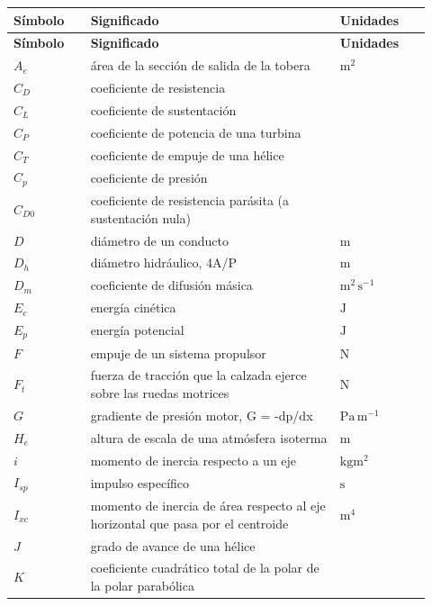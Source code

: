 \documentclass[10pt,openany]{book}
\begin{document}
\begingroup
\setlength{\LTpre}{0pt}
\setlength{\LTpost}{0pt}
\begin{longtable}{@{}>{\centering\arraybackslash}p{0.17\linewidth}>{\raggedright\arraybackslash}p{0.55\linewidth}>{\raggedright\arraybackslash}p{0.2\linewidth}@{}}
\textbf{Símbolo} & \textbf{Significado} & \textbf{Unidades} \\
\hline
\endfirsthead
\textbf{Símbolo} & \textbf{Significado} & \textbf{Unidades} \\
\hline
\endhead
$A_{e}$ & área de la sección de salida de la tobera & $\mathrm{m^{2}}$ \\
$C_{D}$ & coeficiente de resistencia &  \\
$C_{L}$ & coeficiente de sustentación &  \\
$C_{P}$ & coeficiente de potencia de una turbina &  \\
$C_{T}$ & coeficiente de empuje de una hélice &  \\
$C_{p}$ & coeficiente de presión &  \\
$C_{D0}$ & coeficiente de resistencia parásita (a sustentación nula) &  \\
$D$ & diámetro de un conducto & $\mathrm{m}$ \\
$D_{h}$ & diámetro hidráulico, 4A/P & $\mathrm{m}$ \\
$D_{m}$ & coeficiente de difusión másica & $\mathrm{m^{2}\,s^{-1}}$ \\
$E_{c}$ & energía cinética & $\mathrm{J}$ \\
$E_{p}$ & energía potencial & $\mathrm{J}$ \\
$F$ & empuje de un sistema propulsor & $\mathrm{N}$ \\
$F_{t}$ & fuerza de tracción que la calzada ejerce sobre las ruedas motrices & $\mathrm{N}$ \\
$G$ & gradiente de presión motor, G = -dp/dx & $\mathrm{Pa\,m^{-1}}$ \\
$H_{e}$ & altura de escala de una atmósfera isoterma & $\mathrm{m}$ \\
$i$ & momento de inercia respecto a un eje & $\mathrm{kg m^{2}}$ \\
$I_{sp}$ & impulso específico & $\mathrm{s}$ \\
$I_{xc}$ & momento de inercia de área respecto al eje horizontal que pasa por el centroide & $\mathrm{m^{4}}$ \\
$J$ & grado de avance de una hélice &  \\
$K$ & coeficiente cuadrático total de la polar de la polar parabólica &  \\

\end{longtable}
\end{document}
